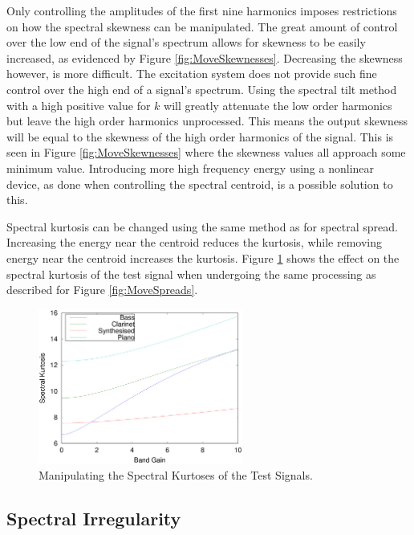 			Only controlling the amplitudes of the first nine harmonics imposes restrictions on how the
			spectral skewness can be manipulated. The great amount of control over the low end of the signal's
			spectrum allows for skewness to be easily increased, as evidenced by Figure
			\ref{fig:MoveSkewnesses}.  Decreasing the skewness however, is more difficult. The excitation
			system does not provide such fine control over the high end of a signal's spectrum. Using the
			spectral tilt method with a high positive value for $k$ will greatly attenuate the low order
			harmonics but leave the high order harmonics unprocessed. This means the output skewness will be
			equal to the skewness of the high order harmonics of the signal. This is seen in Figure
			\ref{fig:MoveSkewnesses} where the skewness values all approach some minimum value. Introducing
			more high frequency energy using a nonlinear device, as done when controlling the spectral
			centroid, is a possible solution to this.

			Spectral kurtosis can be changed using the same method as for spectral spread. Increasing the
			energy near the centroid reduces the kurtosis, while removing energy near the centroid increases
			the kurtosis. Figure \ref{fig:MoveKurtoses} shows the effect on the spectral kurtosis of the test
			signal when undergoing the same processing as described for Figure \ref{fig:MoveSpreads}.
			
			\begin{figure}[h!]
				\centering
				\includegraphics[width=0.6\textwidth]{chapter6/Images/MoveKurtoses.eps}
				\caption{Manipulating the Spectral Kurtoses of the Test Signals.}
				\label{fig:MoveKurtoses}
			\end{figure}

	\subsection{Spectral Irregularity}
	\label{sec:FeatureControl-Parameterisation-Irregularity}
